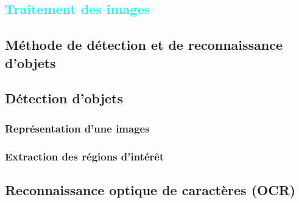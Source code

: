 
%
%

\textcolor{cyan}{\chapter{Traitement des images}}

\section{Méthode de détection et de reconnaissance d'objets}
\lipsum[1]

\section{Détection d'objets }
\subsection{Représentation d'une images}
\lipsum[1]
\lipsum[2]

\subsection{Extraction des régions d'intérêt}
\lipsum[1]

\section{Reconnaissance optique de caractères (OCR)}
\lipsum[1]

